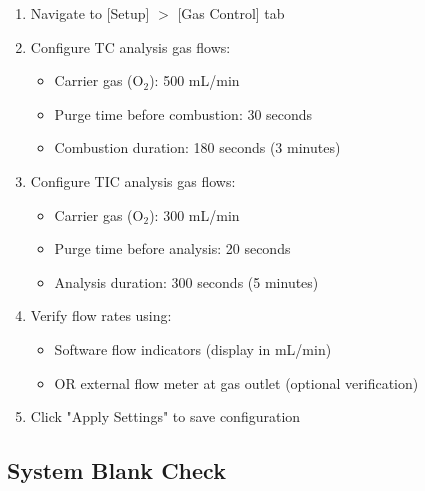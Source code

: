 \documentclass[11pt,a4paper]{article}\usepackage[]{graphicx}\usepackage[]{xcolor}
\begin{document}
\begin{enumerate}[noitemsep]
    \item Navigate to [Setup] $>$ [Gas Control] tab
    \item Configure TC analysis gas flows:
    \begin{itemize}
        \item Carrier gas (O$_2$): 500 mL/min
        \item Purge time before combustion: 30 seconds
        \item Combustion duration: 180 seconds (3 minutes)
    \end{itemize}
    \item Configure TIC analysis gas flows:
    \begin{itemize}
        \item Carrier gas (O$_2$): 300 mL/min
        \item Purge time before analysis: 20 seconds
        \item Analysis duration: 300 seconds (5 minutes)
    \end{itemize}
    \item Verify flow rates using:
    \begin{itemize}
        \item Software flow indicators (display in mL/min)
        \item OR external flow meter at gas outlet (optional verification)
    \end{itemize}
    \item Click "Apply Settings" to save configuration
\end{enumerate}

\subsection{System Blank Check}
\end{document}
